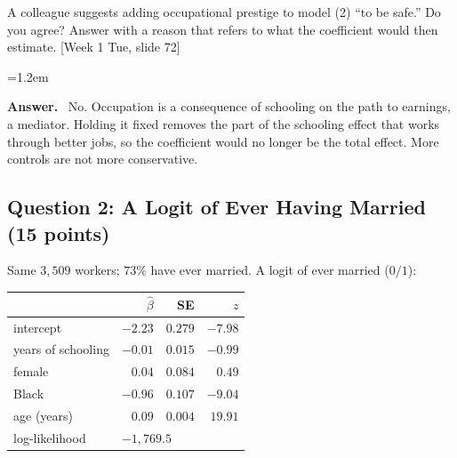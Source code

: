 \documentclass[11pt]{article}
\newenvironment{answer}{\par\smallskip
  \begin{list}{}{\leftmargin=1.2em\rightmargin=0pt}\item[]\color{dukeblue}%
  \textbf{Answer.}\ }{\end{list}\smallskip}
\newcommand{\slideref}[2]{{\footnotesize\color{gray}[Week #1, slide #2]}}
\begin{document}
\begin{enumerate}[label=(\alph*),leftmargin=*,itemsep=6pt]
\item A colleague suggests adding occupational prestige to model (2) ``to be safe.'' Do you
      agree? Answer with a reason that refers to what the coefficient would then estimate.
      \slideref{1 Tue}{72}
\begin{answer}
No. Occupation is a consequence of schooling on the path to earnings, a mediator. Holding it
fixed removes the part of the schooling effect that works through better jobs, so the
coefficient would no longer be the total effect. More controls are not more conservative.
\end{answer}
\end{enumerate}

\newpage
\subsection*{Question 2: A Logit of Ever Having Married (15 points)}
Same $3{,}509$ workers; $73\%$ have ever married. A logit of ever married ($0/1$):
\begin{center}\small
\renewcommand{\arraystretch}{1.0}
\begin{tabular}{lrrr}
\toprule
 & $\hat\beta$ & SE & $z$ \\
\midrule
intercept & $-2.23$ & $0.279$ & $-7.98$ \\
years of schooling & $-0.01$ & $0.015$ & $-0.99$ \\
female & $0.04$ & $0.084$ & $0.49$ \\
Black & $-0.96$ & $0.107$ & $-9.04$ \\
age (years) & $0.09$ & $0.004$ & $19.91$ \\
\midrule
log-likelihood & \multicolumn{3}{l}{$-1{,}769.5$} \\
\bottomrule
\end{tabular}
\end{center}
\end{document}
